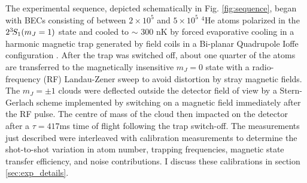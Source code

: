	The experimental sequence, depicted schematically in Fig. \ref{fig:sequence}, began with BECs consisting of between $2\times 10^5$ and $5\times 10^5$ $^4$He atoms polarized in the $2^{3\!}S_1(m_J=1)$ state and cooled to $\sim$ 300 nK by forced evaporative cooling in a harmonic magnetic trap generated by field coils in a Bi-planar Quadrupole Ioffe configuration \cite{Dall07}. 
	After the trap was switched off,  about one quarter of the atoms are transferred to the magnetically insensitive $m_J=0$ state with a radio-frequency (RF) Landau-Zener sweep to avoid distortion by stray magnetic fields.
	The $m_J=\pm 1$ clouds were deflected outside the detector field of view by a Stern-Gerlach scheme implemented by switching on a magnetic field immediately after the RF pulse.
	The centre of mass of the cloud then impacted on the detector after a $\tau = 417$ms time of flight following the trap switch-off. 
	The measurements just described were interleaved with calibration measurements to determine the shot-to-shot variation in atom number, trapping frequencies, magnetic state transfer efficiency, and noise contributions. I discuss these calibrations  in section \ref{sec:exp_details}.

	


